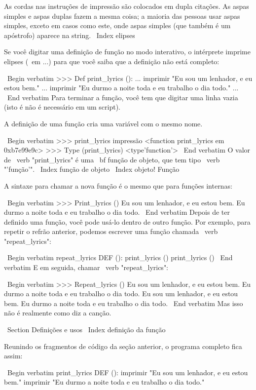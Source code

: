 \documentclass[10pt]{book}
\begin{document}
{As cordas nas instruções de impressão são colocados em dupla
citações. As aspas simples e aspas duplas fazem a mesma coisa;
a maioria das pessoas usar aspas simples, exceto em casos como este, onde
aspas simples (que também é um apóstrofo) aparece na string.
\ Index {} elipses

Se você digitar uma definição de função no modo interativo, o intérprete
imprime elipses ({\ em ...}) para que você saiba que a definição
não está completo:

\ Begin {verbatim}
>>> Def print_lyrics ():
... imprimir "Eu sou um lenhador, e eu estou bem."
... imprimir "Eu durmo a noite toda e eu trabalho o dia todo."
...
\ End {verbatim}
%
Para terminar a função, você tem que digitar uma linha vazia (isto é
não é necessário em um script).

A definição de uma função cria uma variável com o mesmo nome.

\ Begin {verbatim}
>>> print_lyrics impressão
<function print_lyrics em 0xb7e99e9c>
>>> Type (print_lyrics)
<type'function'>
\ End {verbatim}
%
O valor de \ verb "print_lyrics" é uma {\ bf função de objeto}, que
tem tipo \ verb "'função'".
\ Index {função de objeto}
\ Index {objeto! Função}

A sintaxe para chamar a nova função é o mesmo que
para funções internas:

\ Begin {verbatim}
>>> Print_lyrics ()
Eu sou um lenhador, e eu estou bem.
Eu durmo a noite toda e eu trabalho o dia todo.
\ End {verbatim}
%
Depois de ter definido uma função, você pode usá-lo dentro de outro
função. Por exemplo, para repetir o refrão anterior, podemos escrever
uma função chamada \ verb "repeat_lyrics":

\ Begin {verbatim}
repeat_lyrics DEF ():
    print_lyrics ()
    print_lyrics ()
\ End {verbatim}
%
E em seguida, chamar \ verb "repeat_lyrics":

\ Begin {verbatim}
>>> Repeat_lyrics ()
Eu sou um lenhador, e eu estou bem.
Eu durmo a noite toda e eu trabalho o dia todo.
Eu sou um lenhador, e eu estou bem.
Eu durmo a noite toda e eu trabalho o dia todo.
\ End {verbatim}
%
Mas isso não é realmente como diz a canção.


\ Section {Definições e usos}
\ Index {definição da função}

Reunindo os fragmentos de código da seção anterior, o
programa completo fica assim:

\ Begin {verbatim}
print_lyrics DEF ():
    imprimir "Eu sou um lenhador, e eu estou bem."
    imprimir "Eu durmo a noite toda e eu trabalho o dia todo."

}
\end{document}
